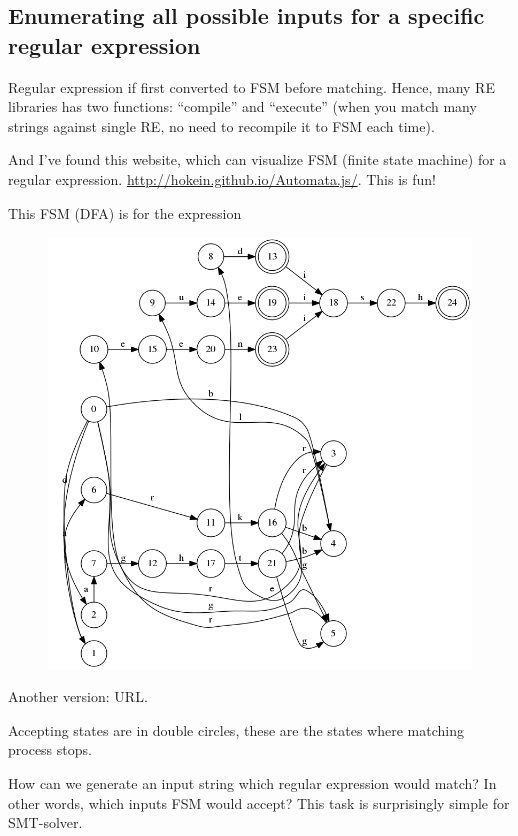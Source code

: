 \subsection{Enumerating all possible inputs for a specific regular expression}

Regular expression if first converted to \ac{FSM} before matching.
Hence, many \ac{RE} libraries has two functions: ``compile'' and ``execute''
(when you match many strings against single RE, no need to recompile it to \ac{FSM} each time).

And I've found this website, which can visualize FSM (finite state machine) for a regular expression.
\url{http://hokein.github.io/Automata.js/}.
This is fun!

This \ac{FSM} (\ac{DFA}) is for the expression 

\begin{figure}[H]
\centering
\includegraphics[scale=0.6]{SMT/regexp/1.png}
\caption{}
\end{figure}

Another version: URL.

Accepting states are in double circles, these are the states where matching process stops.

How can we generate an input string which regular expression would match?
In other words, which inputs \ac{FSM} would accept?
This task is surprisingly simple for SMT-solver.

